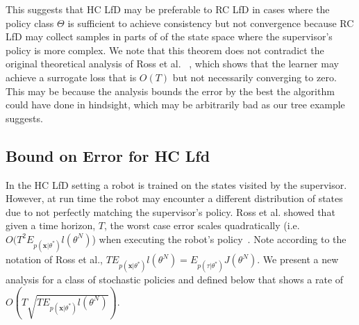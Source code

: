 \documentclass[10pt, conference]{ieeeconf}      %
\newcommand{\bx}{\mathbf{x}}
\newcommand{\ns}{HC LfD }
\newcommand{\nc}{RC LfD }
\begin{document}
This suggests that \ns may be preferable to \nc in cases where the policy class $\Theta$ is sufficient to achieve consistency but not convergence because \nc may collect samples in parts of of the state space where the supervisor's policy is more complex.
We note that this theorem does not contradict the original theoretical analysis of Ross et al. ~\cite{ross2010reduction}, which shows that the learner may achieve a surrogate loss that is $O(T)$ but not necessarily converging to zero.
This may be because the analysis bounds the error by the best the algorithm could have done in hindsight, which may be arbitrarily bad as our tree example suggests. 

%
%

\subsection{Bound on Error for HC Lfd}
In the HC LfD setting a robot is trained on the states visited by the supervisor. However, at run time the robot may encounter a different distribution of states due to not perfectly matching the supervisor's policy. Ross et al. showed that given a time horizon, $T$, the worst case error scales quadratically (i.e. $O(T^2E_{p(\bx|\theta^*)} l(\theta^N)$) when executing the robot's policy~\cite{ross2010efficient}. Note according to the notation of Ross et al., $TE_{p(\bx|\theta^*)} l(\theta^N) = E_{p(\tau|\theta^*)} J(\theta^N)$. We present a new analysis for a class of stochastic policies and  defined below that shows a rate of $O(T\sqrt{TE_{p(\bx|\theta^*)} l(\theta^N)})$.
\end{document}
